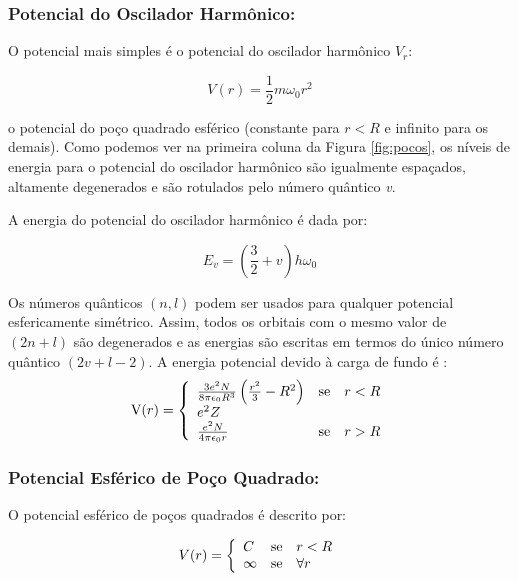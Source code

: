 \subsubsection{Potencial do Oscilador Harmônico:}

O potencial mais simples é o potencial do oscilador harmônico $V_{r}$:

\begin{equation}
    V(r)= \frac{1}{2}m\omega_0r^2
\end{equation}

o potencial do poço quadrado esférico (constante para $r<R$ e infinito para os demais). Como podemos ver na primeira coluna da Figura \ref{fig:pocos}, os níveis de energia para o potencial do oscilador harmônico são igualmente espaçados, altamente degenerados e são rotulados pelo número quântico \textit{v}.


A energia do potencial do oscilador harmônico é dada por:

\begin{equation}
    E_{v}= \left(\frac{3}{2}+v\right)h\omega_0
\end{equation}

Os números quânticos $(n,l)$ podem ser usados para qualquer potencial esfericamente simétrico. Assim, todos os orbitais com o mesmo valor de $(2n+l)$ são degenerados e as energias são escritas em termos do único número quântico $(2v+l-2)$. A energia potencial devido à carga de fundo é \cite{livro_cap16_Misra2012527}:
\begin{equation}
    \hbox{V}(r)
= \left\{ \begin{array}{lll}
\frac{3e^2N}{8\pi\epsilon_0R^3}\left(\frac{r^2}{3}-R^2\right) & \hbox{se} & r<R \\
e^2 Z & \hbox{} &  \\
\frac{e^2N}{4\pi\epsilon_0r} & \hbox{se} & r > R
\end{array}\right.
\end{equation}

\subsubsection{Potencial Esférico de Poço Quadrado:}

O potencial esférico de poços quadrados é descrito por:



\begin{equation}
 V(r) = \left\{\begin{array}{lll}
C & \hbox{se} & r < R \\
\infty & \hbox{se}  & \forall r
\end{array}\right.
\end{equation}




